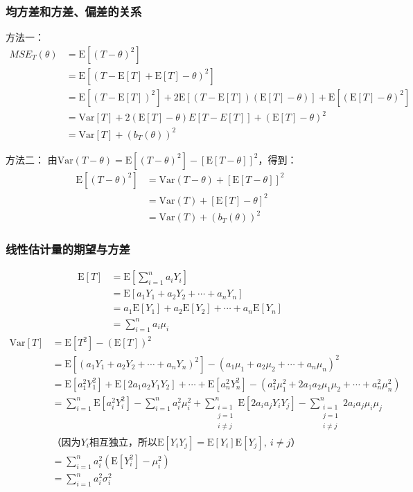\documentclass[UTF8]{ctexbook}
\begin{document}
\subsubsection{均方差和方差、偏差的关系}
\label{proof1}
方法一：
\begin{align*}
	MSE_T(\theta)&=\mathrm{E}[(T-\theta)^2] \\
	&=\mathrm{E}[(T-\mathrm{E}[T]+\mathrm{E}[T]-\theta)^2]\\
	&=\mathrm{E}[(T-\mathrm{E}[T])^2]+2\mathrm{E}[(T-\mathrm{E}[T])(\mathrm{E}[T]-\theta)]+\mathrm{E}[(\mathrm{E}[T]-\theta)^2]\\
	&=\mathrm{Var}[T]+2(\mathrm{E}[T]-\theta)E[T-E[T]]+(\mathrm{E}[T]-\theta)^2\\
	&=\mathrm{Var}[T]+(b_T(\theta))^2
\end{align*}

方法二：
由$\mathrm{Var}(T-\theta)=\mathrm{E}[(T-\theta)^2]-[\mathrm{E}[T-\theta]]^2$，得到：
\begin{align*}
	\mathrm{E}[(T-\theta)^2]&=\mathrm{Var}(T-\theta)+[\mathrm{E}[T-\theta]]^2\\
	&=\mathrm{Var}(T)+[\mathrm{E}[T]-\theta]^2\\
	&=\mathrm{Var}(T)+(b_T(\theta))^2
\end{align*}
\subsubsection{线性估计量的期望与方差}
\label{proof2}
\begin{align*}
	\mathrm{E}[T]&=\mathrm{E}[\sum_{i=1}^na_iY_i]\\
	&=\mathrm{E}[a_1Y_1+a_2Y_2+\cdots+a_nY_n]\\
	&=a_1\mathrm{E}[Y_1]+a_2\mathrm{E}[Y_2]+\cdots+a_n\mathrm{E}[Y_n]\\
	&=\sum_{i=1}^na_i\mu_i
\end{align*}
\begin{align*}
	\mathrm{Var}[T]&=\mathrm{E}[T^2]-(\mathrm{E}[T])^2\\
	&=\mathrm{E}[(a_1Y_1+a_2Y_2+\cdots+a_nY_n)^2]-(a_1\mu_1+a_2\mu_2+\cdots+a_n\mu_n)^2\\
	&=\mathrm{E}[a_1^2Y_1^2]+\mathrm{E}[2a_1a_2Y_1Y_2]+\cdots+\mathrm{E}[a_n^2Y_n^2]-(a_1^2\mu_1^2+2a_1a_2\mu_1\mu_2+\cdots+a_n^2\mu_n^2)\\
	&=\sum_{i=1}^n\mathrm{E}[a_i^2Y_i^2]-\sum_{i=1}^na_i^2\mu_i^2+\sum_{\substack{i=1\\j=1\\i\neq j}}^n\mathrm{E}[2a_ia_jY_iY_j]-\sum_{\substack{i=1\\j=1\\i\neq j}}^n2a_ia_j\mu_i\mu_j\\
	&\text{（因为$Y_i$相互独立，所以$\mathrm{E}[Y_iY_j]=\mathrm{E}[Y_i]\mathrm{E}[Y_j],\ i\neq j$）}\\
	&=\sum_{i=1}^na_i^2(\mathrm{E}[Y_i^2]-\mu_i^2)\\
	&=\sum_{i=1}^na_i^2\sigma_i^2
\end{align*}
\end{document}
